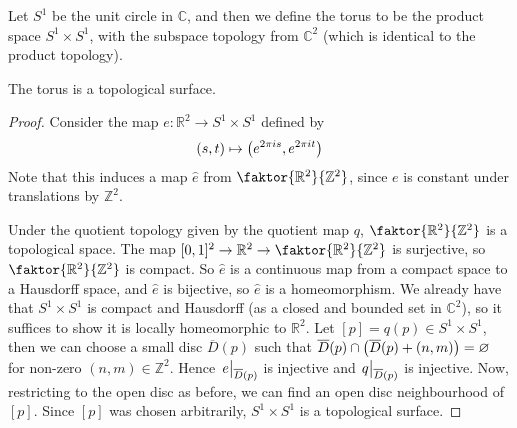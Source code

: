 \begin{example}
	Let \( S^1 \) be the unit circle in \( \mathbb C \), and then we define the torus to be the product space \( S^1 \times S^1 \), with the subspace topology from \( \mathbb C^2 \) (which is identical to the product topology).
	\begin{lemma}
		The torus is a topological surface.
	\end{lemma}
	\begin{proof}
		Consider the map \( e \colon \mathbb R^2 \to S^1 \times S^1 \) defined by
		\[
			(s,t) \mapsto \qty(e^{2\pi i s}, e^{2 \pi i t})
		\]
		Note that this induces a map \( \hat e \) from \( \faktor{\mathbb R^2}{\mathbb Z^2} \), since \( e \) is constant under translations by \( \mathbb Z^2 \).

		\begin{center}
			\ifdefined\hideproofs
			\else
			\fi
		\end{center}

		Under the quotient topology given by the quotient map \( q \), \( \faktor{\mathbb R^2}{\mathbb Z^2} \) is a topological space.
		The map \( [0,1]^2 \to \mathbb R^2 \to \faktor{\mathbb R^2}{\mathbb Z^2} \) is surjective, so \( \faktor{\mathbb R^2}{\mathbb Z^2} \) is compact.
		So \( \hat e \) is a continuous map from a compact space to a Hausdorff space, and \( \hat e \) is bijective, so \( \hat e \) is a homeomorphism.
		We already have that \( S^1 \times S^1 \) is compact and Hausdorff (as a closed and bounded set in \( \mathbb C^2 \)), so it suffices to show it is locally homeomorphic to \( \mathbb R^2 \).
		Let \( [p] = q(p) \in S^1 \times S^1 \), then we can choose a small disc \( \overline D(p) \) such that \( \overline D(p) \cap \qty(\overline D(p) + (n,m)) = \varnothing \) for non-zero \( (n,m) \in \mathbb Z^2 \).
		Hence \( \eval{e}_{\overline D(p)} \) is injective and \( \eval{q}_{\overline D(p)} \) is injective.
		Now, restricting to the open disc as before, we can find an open disc neighbourhood of \( [p] \).
		Since \( [p] \) was chosen arbitrarily, \( S^1 \times S^1 \) is a topological surface.
	\end{proof}
\end{example}

